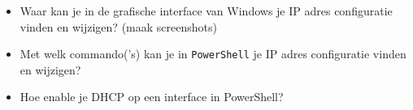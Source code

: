 \begin{itemize}
	\item Waar kan je in de grafische interface van Windows je IP adres configuratie vinden en wijzigen? (maak screenshots)
	\item Met welk commando('s) kan je in \texttt{PowerShell} je IP adres configuratie vinden en wijzigen?
	\item Hoe enable je DHCP op een interface in PowerShell?
\end{itemize}

